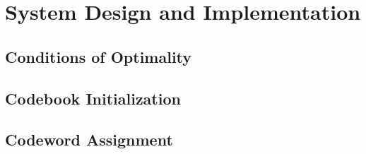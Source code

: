 \documentclass[10pt]{article}
\begin{document}
\section{System Design and Implementation}

\subsection{Conditions of Optimality}




\subsection{Codebook Initialization}



\subsection{Codeword Assignment}
\end{document}

